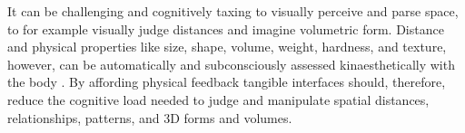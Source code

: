 It can be challenging and cognitively taxing to visually perceive and parse space, to for example visually judge distances and imagine volumetric form.
%
Distance and physical properties like size, shape, volume, weight, hardness, and texture, however, can be automatically and subconsciously assessed kinaesthetically with the body \cite{Jeannerod1997}. 
%
By affording physical feedback tangible interfaces should, therefore, reduce the cognitive load needed to judge and manipulate spatial distances, relationships, patterns, and 3D forms and volumes. 

%



